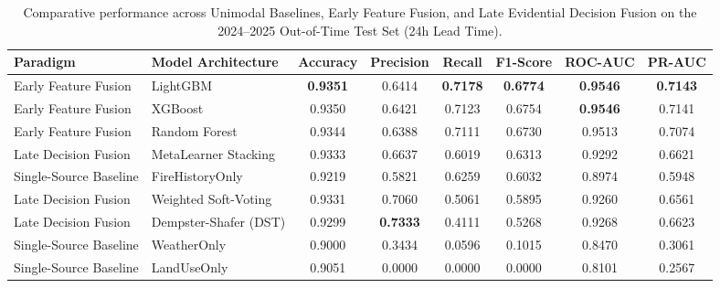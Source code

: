 \documentclass[runningheads]{llncs}
\begin{document}
\begin{table}[htbp]
\centering
\caption{Comparative performance across Unimodal Baselines, Early Feature Fusion, and Late Evidential Decision Fusion on the 2024--2025 Out-of-Time Test Set (24h Lead Time).}
\label{tab:model_comparison}
\small
\begin{tabular}{llcccccc}
\toprule
\textbf{Paradigm} & \textbf{Model Architecture} & \textbf{Accuracy} & \textbf{Precision} & \textbf{Recall} & \textbf{F1-Score} & \textbf{ROC-AUC} & \textbf{PR-AUC} \\
\midrule
Early Feature Fusion & LightGBM & \textbf{0.9351} & 0.6414 & \textbf{0.7178} & \textbf{0.6774} & \textbf{0.9546} & \textbf{0.7143} \\
Early Feature Fusion & XGBoost & 0.9350 & 0.6421 & 0.7123 & 0.6754 & \textbf{0.9546} & 0.7141 \\
Early Feature Fusion & Random Forest & 0.9344 & 0.6388 & 0.7111 & 0.6730 & 0.9513 & 0.7074 \\
Late Decision Fusion & MetaLearner Stacking & 0.9333 & 0.6637 & 0.6019 & 0.6313 & 0.9292 & 0.6621 \\
Single-Source Baseline & FireHistoryOnly & 0.9219 & 0.5821 & 0.6259 & 0.6032 & 0.8974 & 0.5948 \\
Late Decision Fusion & Weighted Soft-Voting & 0.9331 & 0.7060 & 0.5061 & 0.5895 & 0.9260 & 0.6561 \\
Late Decision Fusion & Dempster-Shafer (DST) & 0.9299 & \textbf{0.7333} & 0.4111 & 0.5268 & 0.9268 & 0.6623 \\
Single-Source Baseline & WeatherOnly & 0.9000 & 0.3434 & 0.0596 & 0.1015 & 0.8470 & 0.3061 \\
Single-Source Baseline & LandUseOnly & 0.9051 & 0.0000 & 0.0000 & 0.0000 & 0.8101 & 0.2567 \\
\bottomrule
\end{tabular}
\end{table}
\end{document}
